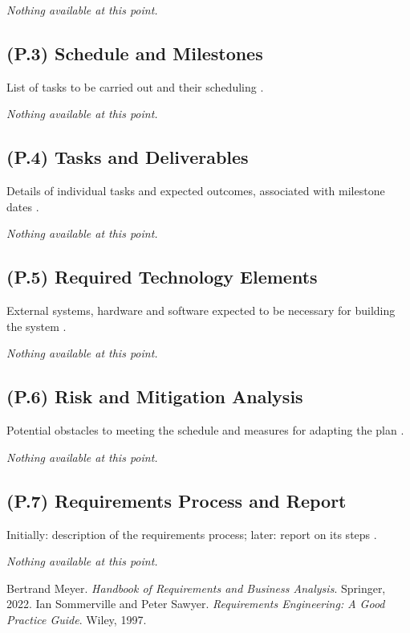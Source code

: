 \documentclass[12pt,letterpaper]{article}
\begin{document}
\textit{Nothing available at this point.}

\subsection{(P.3) Schedule and Milestones}
List of tasks to be carried out and their scheduling \cite{meyer2022}.

\textit{Nothing available at this point.}

\subsection{(P.4) Tasks and Deliverables}
Details of individual tasks and expected outcomes, associated with milestone dates \cite{meyer2022}.

\textit{Nothing available at this point.}

\subsection{(P.5) Required Technology Elements}
External systems, hardware and software expected to be necessary for building the system \cite{meyer2022}.

\textit{Nothing available at this point.}

\subsection{(P.6) Risk and Mitigation Analysis}
Potential obstacles to meeting the schedule and measures for adapting the plan \cite{meyer2022}.

\textit{Nothing available at this point.}

\subsection{(P.7) Requirements Process and Report}
Initially: description of the requirements process; later: report on its steps \cite{meyer2022}.

\textit{Nothing available at this point.}

\clearpage

\begin{thebibliography}{9}
 Bertrand Meyer. \textit{Handbook of Requirements and Business Analysis}. Springer, 2022.
 Ian Sommerville and Peter Sawyer. \textit{Requirements Engineering: A Good Practice Guide}. Wiley, 1997.
\end{thebibliography}
\end{document}
